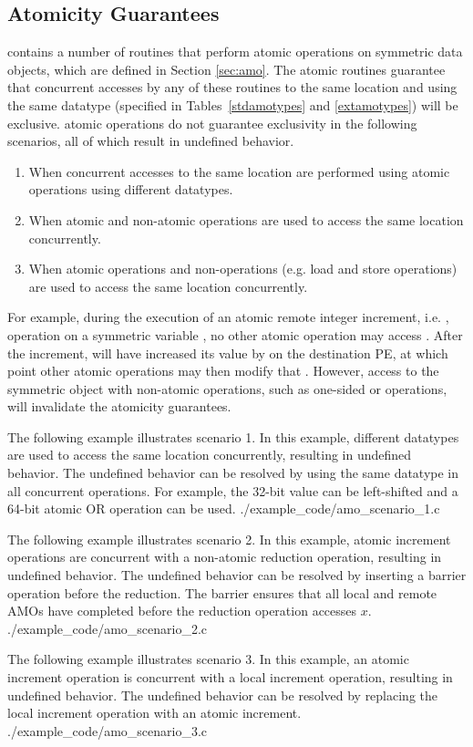 \subsection{Atomicity Guarantees}\label{subsec:amo_guarantees}

\openshmem contains a number of routines that perform atomic operations on
symmetric data objects, which are defined in Section \ref{sec:amo}.
The atomic routines
guarantee that concurrent accesses by any of these routines to the same
location and using the same datatype (specified in Tables~\ref{stdamotypes} and
\ref{extamotypes}) will be exclusive.
\openshmem atomic operations do not guarantee exclusivity in the following
scenarios, all of which result in undefined behavior.
\begin{enumerate}
    \item When concurrent accesses to the same location are performed using
        \openshmem atomic operations using different datatypes.
    \item When atomic and non-atomic \openshmem operations are used to access
        the same location concurrently.
    \item When \openshmem atomic operations and non-\openshmem operations (e.g.
        load and store operations) are used to access the same location
        concurrently.
\end{enumerate}
For example, during the execution of an atomic remote integer increment, i.e. ,
operation on a symmetric variable , no other \openshmem atomic operation
may access .  After the increment,  will have increased its value
by  on the destination \ac{PE}, at which point other atomic operations
may then modify that .  However, access to the symmetric object 
with non-atomic operations, such as one-sided  or  operations,
will invalidate the atomicity guarantees.

\cexample
    {The following \CorCpp example illustrates scenario 1.  In this example,
    different datatypes are used to access the same location concurrently,
    resulting in undefined behavior.  The undefined behavior can be resolved by
    using the same datatype in all concurrent operations.  For example, the
    32-bit value can be left-shifted and a 64-bit atomic OR operation can be
    used.}
    {./example_code/amo_scenario_1.c}

\cexample
    {The following \CorCpp example illustrates scenario 2.  In this example,
    atomic increment operations are concurrent with a non-atomic reduction
    operation, resulting in undefined behavior.  The undefined behavior can be
    resolved by inserting a barrier operation before the reduction.  The
    barrier ensures that all local and remote AMOs have completed before the
    reduction operation accesses $x$.}
    {./example_code/amo_scenario_2.c}

\cexample
    {The following \CorCpp example illustrates scenario 3.  In this example, an
    \openshmem atomic increment operation is concurrent with a local increment
    operation, resulting in undefined behavior.  The undefined behavior can be
    resolved by replacing the local increment operation with an \openshmem
    atomic increment.}
    {./example_code/amo_scenario_3.c}
